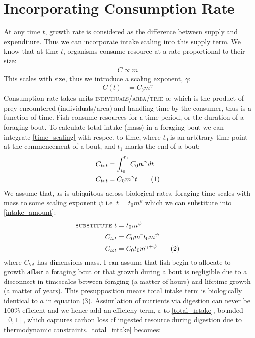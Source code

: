 \documentclass[a4paper]{article} %
\newcommand\numberthis{\addtocounter{equation}{1}\tag{\theequation}}
\begin{document}
\section{Incorporating Consumption Rate}
At any time $t$, growth rate is considered as the difference between supply and expenditure. Thus we can incorporate intake scaling into this supply term.
We know that at time $t$, organisms consume resource at a rate proportional to their size:
\begin{align*}
    C \propto m
\end{align*}
This scales with size, thus we introduce a scaling exponent, $\gamma$:
\begin{align}
    C(t) &= C_{0}m^{\gamma} \label{time_scaling}
\end{align}
Consumption rate takes units \textsc{individuals/area/time} or which is the product of prey encountered (individuals/area) and handling time by the consumer, thus is a function of time. Fish consume resources for a time period, or the duration of a foraging bout. To calculate total intake (mass) in a foraging bout we can integrate \cref{time_scaling} with respect to time, where $t_0$ is an arbitrary time point at the commencement of a bout, and $t_1$ marks the end of a bout:
\begin{align*}
    C_{tot} &= \int_{t_{0}}^{t_{1}}C_{0}m^{\gamma}dt \\
    C_{tot} &= C_{0}m^{\gamma}t \numberthis \label{intake_amount}
\end{align*}
We assume that, as is ubiquitous across biological rates, foraging time scales with mass to some scaling exponent $\psi$ i.e. $t = t_{0}m^{\psi}$ which we can substitute into \cref{intake_amount}:
\begin{align*}
    \textsc{substitute } t &= t_{0}m^{\psi} \\
    C_{tot} &= C_{0}m^{\gamma}t_{0}m^{\psi} \\
    C_{tot} &= C_{0}t_{0}m^{\gamma + \psi} \numberthis \label{total_intake}
\end{align*}
where $C_{tot}$ has dimensions mass. I can assume that fish begin to allocate to growth \textbf{after} a foraging bout or that growth during a bout is negligible due to a disconnect in timescales between foraging (a matter of hours) and lifetime growth (a matter of years). This presupposition means total intake term is biologically identical to $a$ in equation (3). Assimilation of nutrients via digestion can never be 100\% efficient and we hence add an efficieny term, $\varepsilon$ to \cref{total_intake}, bounded $[0,1]$, which captures carbon loss of ingested resource during digestion due to thermodynamic constraints. \cref{total_intake} becomes:
\end{document}
